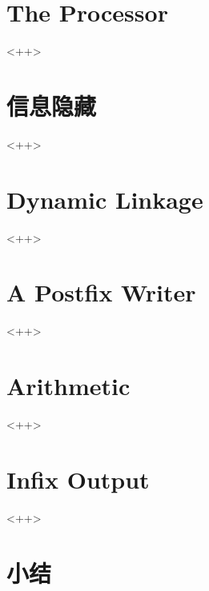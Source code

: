 \section{The Processor}<++>

\section{信息隐藏}<++>

\section{Dynamic Linkage}<++>

\section{A Postfix Writer}<++>

\section{Arithmetic}<++>

\section{Infix Output}<++>

\section{小结}


\newpage{\thispagestyle{empty}\cleardoublepage}

